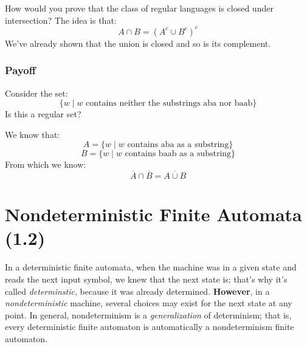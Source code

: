 \documentclass[letterpaper]{article}
\begin{document}
\bigskip 

How would you prove that the class of regular languages is closed under intersection? The idea is that:
\[A \cap B = (A^c \cup B^c)^c\]
We've already shown that the union is closed and so is its complement. 

\subsubsection{Payoff}
Consider the set: 
\[
    \{w \mid w \text{ contains neither the substrings aba nor baab}\}  
\]
Is this a regular set? 

\begin{mdframed}[]
    We know that:
    \[A = \{w \mid w \text{ contains aba as a substring}\}\]
    \[B = \{w \mid w \text{ contains baab as a substring}\}\]
    From which we know: 
    \[\overline{A} \cap \overline{B} = \overline{A \cup B}\]
\end{mdframed}









































\newpage 
\section{Nondeterministic Finite Automata (1.2)}
In a deterministic finite automata, when the machine was in a given state and reads the next input symbol, we knew that the next state is; that's why it's called \emph{determinstic}, because it was already determined. \textbf{However}, in a \emph{nondeterministic} machine, several choices may exist for the next state at any point. In general, nondeterminism is a \emph{generalization} of determinism; that is, every deterministic finite automaton is automatically a nondeterminism finite automaton.
\end{document}
